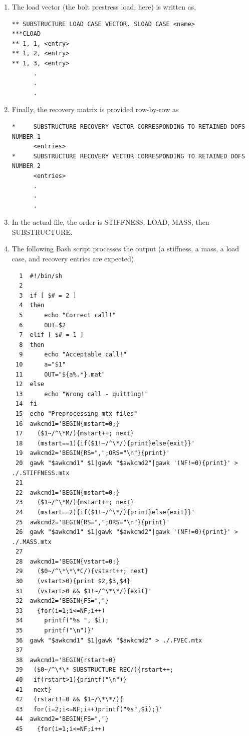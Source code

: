 \documentclass[11pt]{article}
\begin{document}
\begin{enumerate}
\begin{verbatim}
*     MATRIX,TYPE=MASS
      <Mass matrix entries in upper triangular form>      
\end{verbatim}
\item The load vector (the bolt prestress load, here) is written as,
\begin{verbatim}
** SUBSTRUCTURE LOAD CASE VECTOR. SLOAD CASE <name>
***CLOAD 
** 1, 1, <entry>
** 1, 2, <entry>
** 1, 3, <entry>
      .
      .
      .
\end{verbatim}
\item Finally, the recovery matrix is provided row-by-row as
\begin{verbatim}
*     SUBSTRUCTURE RECOVERY VECTOR CORRESPONDING TO RETAINED DOFS NUMBER 1
      <entries>
*     SUBSTRUCTURE RECOVERY VECTOR CORRESPONDING TO RETAINED DOFS NUMBER 2
      <entries>
      .
      .
      .
\end{verbatim}
\item In the actual file, the order is STIFFNESS, LOAD, MASS, then SUBSTRUCTURE.
\item The following Bash script processes the output (a stiffness, a mass, a load case, and recovery entries are expected)
\begin{verbatim}
  1  #!/bin/sh
  2  
  3  if [ $# = 2 ]
  4  then 
  5      echo "Correct call!"
  6      OUT=$2
  7  elif [ $# = 1 ]
  8  then
  9      echo "Acceptable call!"
 10      a="$1"
 11      OUT="${a%.*}.mat"
 12  else
 13      echo "Wrong call - quitting!"
 14  fi
 15  echo "Preprocessing mtx files"
 16  awkcmd1='BEGIN{mstart=0;}
 17    ($1~/^\*M/){mstart++; next}
 18    (mstart==1){if($1!~/^\*/){print}else{exit}}'
 19  awkcmd2='BEGIN{RS=",";ORS="\n"}{print}'
 20  gawk "$awkcmd1" $1|gawk "$awkcmd2"|gawk '(NF!=0){print}' > ./.STIFFNESS.mtx
 21  
 22  awkcmd1='BEGIN{mstart=0;}
 23    ($1~/^\*M/){mstart++; next}
 24    (mstart==2){if($1!~/^\*/){print}else{exit}}'
 25  awkcmd2='BEGIN{RS=",";ORS="\n"}{print}'
 26  gawk "$awkcmd1" $1|gawk "$awkcmd2"|gawk '(NF!=0){print}' > ./.MASS.mtx
 27  
 28  awkcmd1='BEGIN{vstart=0;}
 29    ($0~/^\*\*\*C/){vstart++; next}
 30    (vstart>0){print $2,$3,$4}
 31    (vstart>0 && $1!~/^\*\*/){exit}'
 32  awkcmd2='BEGIN{FS=","}
 33    {for(i=1;i<=NF;i++)
 34      printf("%s ", $i);
 35      printf("\n")}'
 36  gawk "$awkcmd1" $1|gawk "$awkcmd2" > ./.FVEC.mtx
 37  
 38  awkcmd1='BEGIN{rstart=0}
 39   ($0~/^\*\* SUBSTRUCTURE REC/){rstart++;
 40   if(rstart>1){printf("\n")}
 41   next}
 42   (rstart!=0 && $1~/\*\*/){
 43   for(i=2;i<=NF;i++)printf("%s",$i);}'
 44  awkcmd2='BEGIN{FS=","}
 45    {for(i=1;i<=NF;i++)

\end{verbatim}
\end{enumerate}
\end{document}
